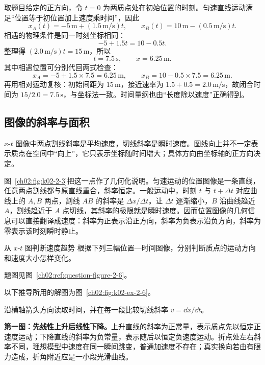 {\begin{xesolution}
取题目给定的正方向，令 $t=0$ 为两质点处在初始位置的时刻。匀速直线运动满足“位置等于初位置加上速度乘时间”，因此
\[
x_A(t)=-5\,\mathrm m+(1.5\,\mathrm{m/s})t,
\qquad
x_B(t)=10\,\mathrm m-(0.5\,\mathrm{m/s})t.
\]
相遇的物理条件是同一时刻坐标相同：
\[
-5+1.5t=10-0.5t.
\]
整理得 $(2.0\,\mathrm{m/s})t=15\,\mathrm m$，所以
\[
\boxed{t=7.5\,\mathrm s},\qquad
\boxed{x=6.25\,\mathrm m}.
\]
其中相遇位置可分别代回两式检查：
\[
x_A=-5+1.5\times7.5=6.25\,\mathrm m,
\qquad
x_B=10-0.5\times7.5=6.25\,\mathrm m.
\]
再用相对运动复核：初始间距为 $15\,\mathrm m$，接近速率为
$1.5+0.5=2.0\,\mathrm{m/s}$，故闭合时间为 $15/2.0=7.5\,\mathrm s$，与坐标法一致。时间量纲也由“长度除以速度”正确得到。
\end{xesolution}

\subsection{图像的斜率与面积}

\PositionSlopeDiagram

$x$-$t$ 图像中两点割线斜率是平均速度，切线斜率是瞬时速度。图线向上并不一定表示质点在空间中“向上”，它只表示坐标随时间增大；具体方向由坐标轴的正方向决定。

图~\ref{ch02:fig:k02-2-3}把这一点作了几何化说明。匀速运动的位置图像是一条直线，任意两点割线都与原直线重合，斜率恒定。一般运动中，时刻 $t$ 与 $t+\Delta t$ 对应曲线上的 $A,B$ 两点，割线 $AB$ 的斜率是 $\Delta x/\Delta t$。让 $\Delta t$ 逐渐缩小，$B$ 沿曲线趋近 $A$，割线趋近于 $A$ 点切线，其斜率的极限就是瞬时速度。因而位置图像的几何信息可以直接翻译成速度：斜率为正表示沿正方向，斜率为负表示沿负方向，斜率为零表示该时刻瞬时静止。

\begin{origexamplebox}{从 $x$-$t$ 图判断速度趋势}\label{ch02:ex:k02-2-6}
根据下列三幅位置—时间图像，分别判断质点的运动方向和速度大小怎样变化。
\par 题图见图~\ref{ch02:ref:question-figure-2-6}。
\KQuestionAG
\end{origexamplebox}
\begin{xesolution}
以下推导所用的解图为图~\ref{ch02:fig:k02-ex-2-6}。

沿横轴箭头方向读取时间，并在每一段比较切线斜率 $v=\dd x/\dd t$。


\ExampleTwoSixGraphs
\textbf{第一图：先线性上升后线性下降。}上升直线的斜率为正常量，表示质点先以恒定正速度运动；下降直线的斜率为负常量，表示随后以恒定负速度运动。折点处左右斜率不同，理想模型中速度在同一瞬间跳变，普通加速度不存在；真实换向若由有限力造成，折角附近应是一小段光滑曲线。


\end{xesolution}}
